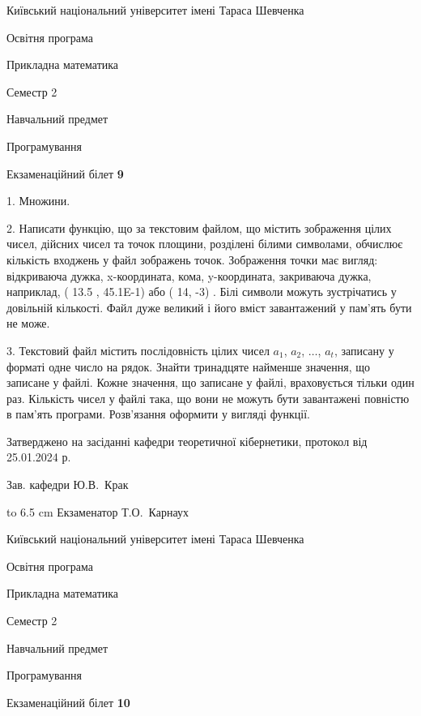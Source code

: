 \documentclass[12pt, ukrainian]{article}
\begin{document}
{{\begin {scriptsize}\par
{ \center  Київський національний університет імені Тараса Шевченка \par}
{\parbox {5 cm}{Освітня програма \hfill}{\parbox {7 cm}{Прикладна математика\hfill}}\parbox {6 cm}{\hfill Семестр 2}}\par
{\parbox {5 cm} {Навчальний предмет \hfill}\parbox {7 cm}{Програмування \hfill}\parbox {6cm}{\hfill}\par}\vspace{-15pt} \end{scriptsize}}{\center Екзаменаційний білет \No \textbf { 9 }\par}}
{%
1. Множини.%
\par
2. Написати функцію, що за текстовим файлом, що містить зображення цілих чисел, дійсних чисел та точок площини, розділені білими символами, обчислює кількість входжень у файл зображень точок. Зображення точки має вигляд: відкриваюча дужка, x-координата, кома, y-координата, закриваюча дужка, наприклад, ( 13.5 , 45.1E-1) або ( 14, -3) . Білі символи можуть зустрічатись у довільній кількості. Файл дуже великий і його вміст завантажений у пам'ять бути не може.

\par
3. Текстовий файл містить послідовність цілих чисел $a_1$, $a_2$, $\ldots$, $a_t$, записану у форматі одне число на рядок. Знайти тринадцяте найменше значення, що записане у файлі. Кожне значення, що записане у файлі, враховується тільки один раз. Кількість чисел у файлі така, що вони не можуть бути завантажені повністю в пам'ять програми. Розв'язання оформити у вигляді функції.

}
{\smallskip\smallskip \begin {scriptsize} Затверджено на засіданні кафедри теоретичної кібернетики, протокол   від   25.01.2024 р.\par\smallskip\smallskip\smallskip\smallskip
{\parbox {6.5 cm} {Зав. кафедри \dotfill Ю.В.~Крак}}\hspace {0.7cm} {\hbox to 6.5 cm { Екзаменатор \dotfill Т.О.~Карнаух}} \end{scriptsize}}
\newpage
{{\begin {scriptsize}\par
{ \center  Київський національний університет імені Тараса Шевченка \par}
{\parbox {5 cm}{Освітня програма \hfill}{\parbox {7 cm}{Прикладна математика\hfill}}\parbox {6 cm}{\hfill Семестр 2}}\par
{\parbox {5 cm} {Навчальний предмет \hfill}\parbox {7 cm}{Програмування \hfill}\parbox {6cm}{\hfill}\par}\vspace{-15pt} \end{scriptsize}}{\center Екзаменаційний білет \No \textbf { 10 }\par}}
\end{document}
